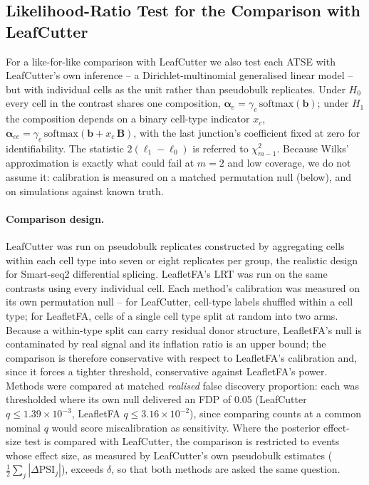 \subsection*{Likelihood-Ratio Test for the Comparison with LeafCutter}
\label{sec:DS_LRT}
For a like-for-like comparison with LeafCutter we also test each ATSE with LeafCutter's own inference -- a Dirichlet-multinomial generalised linear model \cite{Leafcutter} -- but with individual cells as the unit rather than pseudobulk replicates. Under $H_0$ every cell in the contrast shares one composition, $\boldsymbol{\alpha}_e = \gamma_e\,\mathrm{softmax}(\mathbf{b})$; under $H_1$ the composition depends on a binary cell-type indicator $x_c$, $\boldsymbol{\alpha}_{ce} = \gamma_e\,\mathrm{softmax}(\mathbf{b} + x_c\,\mathbf{B})$, with the last junction's coefficient fixed at zero for identifiability. The statistic $2(\ell_1 - \ell_0)$ is referred to $\chi^2_{m-1}$. Because Wilks' approximation is exactly what could fail at $m = 2$ and low coverage, we do not assume it: calibration is measured on a matched permutation null (below), and on simulations against known truth.

\paragraph{Comparison design.} LeafCutter was run on pseudobulk replicates constructed by aggregating cells within each cell type into seven or eight replicates per group, the realistic design for Smart-seq2 differential splicing. LeafletFA's LRT was run on the same contrasts using every individual cell. Each method's calibration was measured on its own permutation null -- for LeafCutter, cell-type labels shuffled within a cell type; for LeafletFA, cells of a single cell type split at random into two arms. Because a within-type split can carry residual donor structure, LeafletFA's null is contaminated by real signal and its inflation ratio is an upper bound; the comparison is therefore conservative with respect to LeafletFA's calibration and, since it forces a tighter threshold, conservative against LeafletFA's power. Methods were compared at matched \emph{realised} false discovery proportion: each was thresholded where its own null delivered an FDP of 0.05 (LeafCutter $q \le 1.39\times10^{-3}$, LeafletFA $q \le 3.16\times10^{-2}$), since comparing counts at a common nominal $q$ would score miscalibration as sensitivity. Where the posterior effect-size test is compared with LeafCutter, the comparison is restricted to events whose effect size, as measured by LeafCutter's own pseudobulk estimates ($\tfrac12\sum_j|\Delta\mathrm{PSI}_j|$), exceeds $\delta$, so that both methods are asked the same question.


